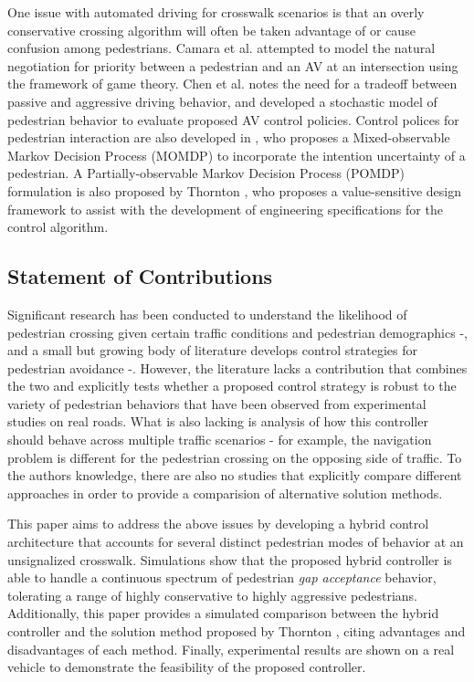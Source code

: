 \documentclass[letterpaper, 10 pt, conference]{ieeeconf} %
\begin{document}
One issue with automated driving for crosswalk scenarios is that an overly conservative crossing algorithm will often be taken advantage of or cause confusion among pedestrians\cite{Camara2018}. Camara et al. \cite{Camara2018} attempted to model the natural negotiation for priority between a pedestrian and an AV at an intersection using the framework of game theory. Chen et al. \cite{Chen} notes the need for a tradeoff between passive and aggressive driving behavior, and developed a stochastic model of pedestrian behavior to evaluate proposed AV control policies. Control polices for pedestrian interaction are also developed in \cite{Bandyopadhyay}, who proposes a Mixed-observable Markov Decision Process (MOMDP) to incorporate the intention uncertainty of a pedestrian. A Partially-observable Markov Decision Process (POMDP) formulation is also proposed by Thornton \cite{Thornton2018}, who proposes a value-sensitive design framework to assist with the development of engineering specifications for the control algorithm. 

\subsection{Statement of Contributions}
Significant research has been conducted to understand the likelihood of pedestrian crossing given certain traffic conditions and pedestrian demographics \cite{Schroeder2011} -\cite{Lee2005}, and a small but growing body of literature develops control strategies for pedestrian avoidance \cite{Bandyopadhyay}-\cite{Thornton2018}. However, the literature lacks a contribution that combines the two and explicitly tests whether a proposed control strategy is robust to the variety of pedestrian behaviors that have been observed from experimental studies on real roads. What is also lacking is analysis of how this controller should behave across multiple traffic scenarios - for example, the navigation problem is different for the pedestrian crossing on the opposing side of traffic. To the authors knowledge, there are also no studies that explicitly compare different approaches in order to provide a comparision of alternative solution methods. 

This paper aims to address the above issues by developing a hybrid control architecture that accounts for several distinct pedestrian modes of behavior at an unsignalized crosswalk. Simulations show that the proposed hybrid controller is able to handle a continuous spectrum of pedestrian \textit{gap acceptance} behavior, tolerating a range of highly conservative to highly aggressive pedestrians. Additionally, this paper provides a simulated comparison between the hybrid controller and the solution method proposed by Thornton \cite{Thornton2018}, citing advantages and disadvantages of each method. Finally, experimental results are shown on a real vehicle to demonstrate the feasibility of the proposed controller. 
\end{document}
